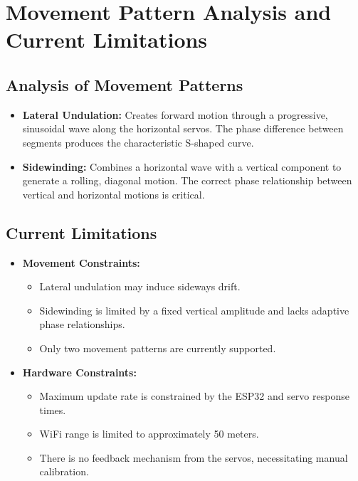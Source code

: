 \documentclass[12pt,a4paper]{report}
\begin{document}
\section{Movement Pattern Analysis and Current Limitations}
\subsection{Analysis of Movement Patterns}
\begin{itemize}
    \item \textbf{Lateral Undulation:} Creates forward motion through a progressive, sinusoidal wave along the horizontal servos. The phase difference between segments produces the characteristic S-shaped curve.
    \item \textbf{Sidewinding:} Combines a horizontal wave with a vertical component to generate a rolling, diagonal motion. The correct phase relationship between vertical and horizontal motions is critical.
\end{itemize}

\subsection{Current Limitations}
\begin{itemize}
    \item \textbf{Movement Constraints:}
        \begin{itemize}
            \item Lateral undulation may induce sideways drift.
            \item Sidewinding is limited by a fixed vertical amplitude and lacks adaptive phase relationships.
            \item Only two movement patterns are currently supported.
        \end{itemize}
    \item \textbf{Hardware Constraints:}
        \begin{itemize}
            \item Maximum update rate is constrained by the ESP32 and servo response times.
            \item WiFi range is limited to approximately 50 meters.
            \item There is no feedback mechanism from the servos, necessitating manual calibration.
        \end{itemize}
\end{itemize}

\end{document}
